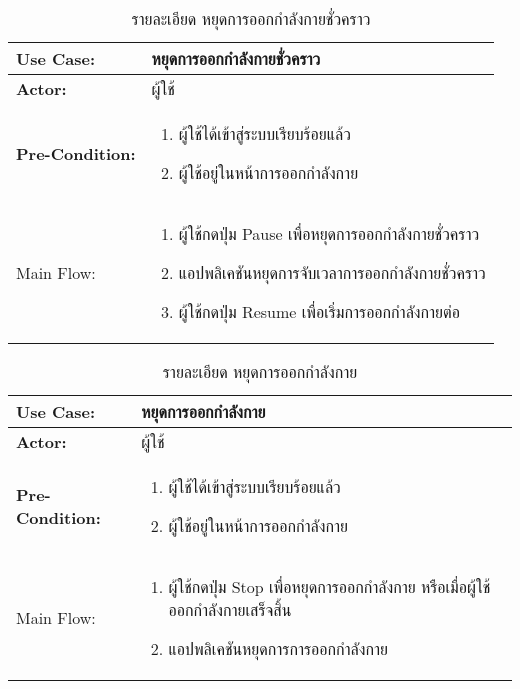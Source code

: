 \begin{table}
    \caption{รายละเอียด หยุดการออกกำลังกายชั่วคราว}
    \begin{tabularx}{\textwidth}{ | >{\centering\bf} p{3cm} | X |}
        \hline
        Use Case: & หยุดการออกกำลังกายชั่วคราว \\\hline
        Actor: & ผู้ใช้ \\\hline
        Pre-Condition: &
        \begin{enumerate}[table]
            \item ผู้ใช้ได้เข้าสู่ระบบเรียบร้อยแล้ว
            \item ผู้ใช้อยู่ในหน้าการออกกำลังกาย
        \end{enumerate} \\\hline
        
        Main Flow: & 
        \begin{enumerate}[table]
            \item ผู้ใช้กดปุ่ม Pause เพื่อหยุดการออกกำลังกายชั่วคราว
            \item แอปพลิเคชันหยุดการจับเวลาการออกกำลังกายชั่วคราว
            \item ผู้ใช้กดปุ่ม Resume เพื่อเริ่มการออกกำลังกายต่อ
        \end{enumerate}\\\hline
    \end{tabularx}
\end{table}

\begin{table}
    \caption{รายละเอียด หยุดการออกกำลังกาย}
    \begin{tabularx}{\textwidth}{ | >{\centering\bf} p{3cm} | X |}
        \hline
        Use Case: & หยุดการออกกำลังกาย \\\hline
        Actor: & ผู้ใช้ \\\hline
        Pre-Condition: &
        \begin{enumerate}[table]
            \item ผู้ใช้ได้เข้าสู่ระบบเรียบร้อยแล้ว
            \item ผู้ใช้อยู่ในหน้าการออกกำลังกาย
        \end{enumerate} \\\hline
        
        Main Flow: & 
        \begin{enumerate}[table]
            \item ผู้ใช้กดปุ่ม Stop เพื่อหยุดการออกกำลังกาย หรือเมื่อผู้ใช้ออกกำลังกายเสร็จสิ้น
            \item แอปพลิเคชันหยุดการการออกกำลังกาย
        \end{enumerate}\\\hline
    \end{tabularx}
\end{table}

